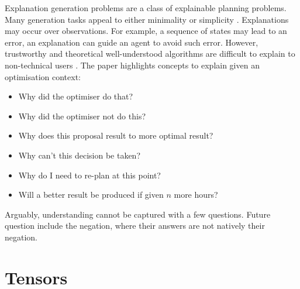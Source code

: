Explanation generation problems are a class of explainable planning problems. Many generation tasks appeal to either minimality or simplicity \cite{pe}. Explanations may occur over observations. For example, a sequence of states may lead to an error, an explanation can guide an agent to avoid such error. However, trustworthy and theoretical well-understood algorithms are difficult to explain to non-technical users \cite{ep}. The paper highlights concepts to explain given an optimisation context:
\begin{itemize}
	\item Why did the optimiser do that?
	\item Why did the optimiser not do this?
	\item Why does this proposal result to more optimal result?
	\item Why can't this decision be taken?
	\item Why do I need to re-plan at this point?
	\item Will a better result be produced if given $n$ more hours?
\end{itemize}

Arguably, understanding cannot be captured with a few questions. Future question include the negation, where their answers are not natively their negation.

\section{Tensors}

